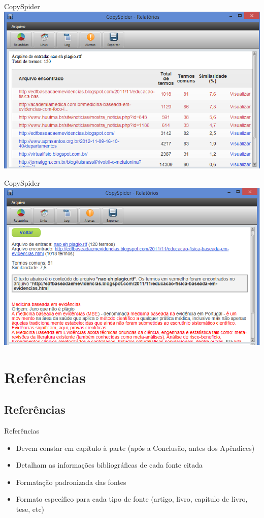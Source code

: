 \documentclass{beamer}
\begin{document}
\begin{frame}{CopySpider}
  \centering
  \includegraphics[width=\textwidth]{Referencias/copyspider3}
\end{frame}

\begin{frame}{CopySpider}
  \centering
  \includegraphics[width=\textwidth]{Referencias/copyspider4}
\end{frame}

\section{Referências}

\subsection{Referências}

\begin{frame}{Referências}
  \begin{itemize}
    \footnotesize
  \item Devem constar em capítulo à parte (após a Conclusão, antes dos
    Apêndices)
    \bigskip
  \item Detalham as informações bibliográficas de cada fonte citada
    \bigskip
  \item Formatação padronizada das fontes
    \bigskip
  \item Formato específico para cada tipo de fonte (artigo, livro,
    capítulo de livro, tese, etc)
  \end{itemize}
\end{frame}
\end{document}
